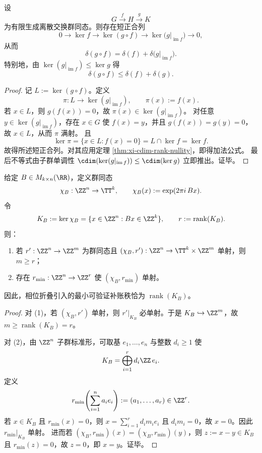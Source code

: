 \begin{theorem}[圆维缺陷的链式法则]\label{thm:xi-cdim-defect-chain-rule}
设
\[
G\xrightarrow{f}H\xrightarrow{g}K
\]
为有限生成离散交换群同态。则存在短正合列
\[
0\longrightarrow \ker f\longrightarrow \ker(g\circ f)\longrightarrow \ker\!\bigl(g|_{\operatorname{im}f}\bigr)\longrightarrow 0,
\]
从而
\[
\delta(g\circ f)=\delta(f)+\delta\!\bigl(g|_{\operatorname{im}f}\bigr).
\]
特别地，由 \(\ker(g|_{\operatorname{im}f})\le \ker g\) 得
\[
\delta(g\circ f)\le \delta(f)+\delta(g).
\]
\end{theorem}
\begin{proof}
记 \(L:=\ker(g\circ f)\)。定义
\[
\pi:L\to \ker(g|_{\operatorname{im}f}),\qquad \pi(x):=f(x).
\]
若 \(x\in L\)，则 \(g(f(x))=0\)，故 \(\pi(x)\in \ker(g|_{\operatorname{im}f})\)。
对任意 \(y\in \ker(g|_{\operatorname{im}f})\)，存在 \(x\in G\) 使 \(f(x)=y\)，并且 \(g(f(x))=g(y)=0\)，故 \(x\in L\)，从而 \(\pi\) 满射。
且
\[
\ker\pi=\{x\in L:f(x)=0\}=L\cap \ker f=\ker f.
\]
故得所述短正合列。对其应用定理 \ref{thm:xi-cdim-rank-nullity}，即得加法公式。
最后不等式由子群单调性
\(
\cdim(\ker(g|_{\operatorname{im}f}))\le \cdim(\ker g)
\)
立即推出。证毕。
\end{proof}

\begin{theorem}[相位折叠核的最小证书秩]\label{thm:xi-phase-fold-kernel-minimal-certificate-rank}
给定 \(B\in M_{k\times n}(\RR)\)，定义群同态
\[
\chi_B:\ZZ^n\to \TT^k,\qquad
\chi_B(x):=\exp(2\pi i\,Bx).
\]
令
\[
K_B:=\ker\chi_B=\{x\in\ZZ^n:Bx\in\ZZ^k\},\qquad r:=\operatorname{rank}(K_B).
\]
则：
\begin{enumerate}
  \item 若 \(r':\ZZ^n\to \ZZ^m\) 为群同态且 \((\chi_B,r'):\ZZ^n\to \TT^k\times \ZZ^m\) 单射，则 \(m\ge r\)；
  \item 存在 \(r_{\min}:\ZZ^n\to \ZZ^r\) 使 \((\chi_B,r_{\min})\) 单射。
\end{enumerate}
因此，相位折叠引入的最小可验证补账秩恰为 \(\operatorname{rank}(K_B)\)。
\end{theorem}
\begin{proof}
对 (1)，若 \((\chi_B,r')\) 单射，则 \(r'|_{K_B}\) 必单射。于是 \(K_B\hookrightarrow \ZZ^m\)，故 \(m\ge \operatorname{rank}(K_B)=r\)。

对 (2)，由 \(\ZZ^n\) 子群标准形，可取基 \(e_1,\dots,e_n\) 与整数 \(d_i\ge 1\) 使
\[
K_B=\bigoplus_{i=1}^{r} d_i\ZZ\,e_i.
\]
定义
\[
r_{\min}\!\left(\sum_{i=1}^n a_i e_i\right):=(a_1,\dots,a_r)\in \ZZ^r.
\]
若 \(x\in K_B\) 且 \(r_{\min}(x)=0\)，则 \(x=\sum_{i=1}^r d_i m_i e_i\) 且 \(d_i m_i=0\)，故 \(x=0\)。因此 \(r_{\min}|_{K_B}\) 单射。
进而若 \((\chi_B,r_{\min})(x)=(\chi_B,r_{\min})(y)\)，则 \(z:=x-y\in K_B\) 且 \(r_{\min}(z)=0\)，故 \(z=0\)，即 \(x=y\)。证毕。
\end{proof}

